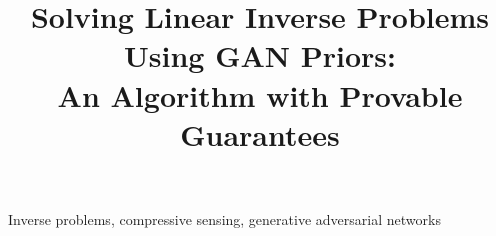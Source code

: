 \documentclass{article}
\title{Solving Linear Inverse Problems Using GAN Priors: \\ An Algorithm with Provable Guarantees}
\numberwithin{equation}{section}
\begin{document}
	\maketitle
	\ninept
	
	\begin{keywords}
	Inverse problems, compressive sensing, generative adversarial networks
	\end{keywords}
	
	
	
	
	
	
	
%	
	{{
	\footnotesize
	
	
	}
	}
	
\end{document}
